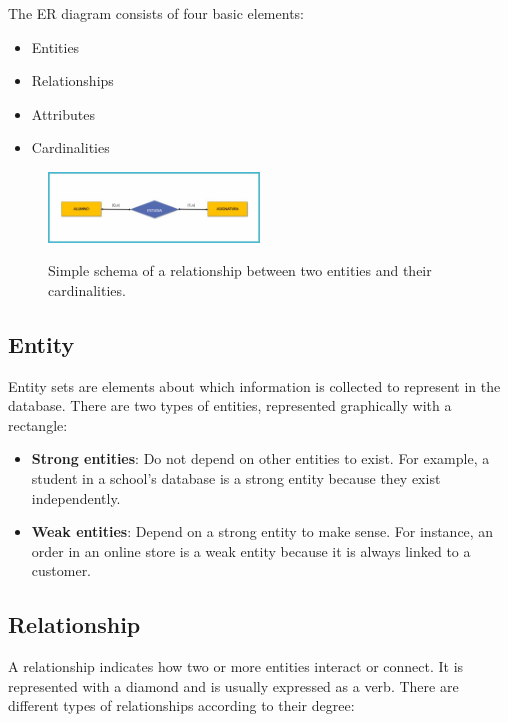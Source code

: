 \documentclass{article}
\begin{document}
The ER diagram consists of four basic elements:

\begin{itemize}
    \item Entities
    \item Relationships
    \item Attributes
    \item Cardinalities
\end{itemize}

\begin{figure}
	\centering
	\includegraphics[bb=0 0 900 300, width=0.5\textwidth]{figures/entidad-relacion-ejemplo.jpg}
	\label{fig:erexample1}
	\caption{Simple schema of a relationship between two entities and their cardinalities.}
\end{figure}

\subsection{Entity}

Entity sets are elements about which information is collected to represent in the database. There are two types of entities, represented graphically with a rectangle:

\begin{itemize}
    \item \textbf{Strong entities}: Do not depend on other entities to exist. For example, a student in a school's database is a strong entity because they exist independently.
    \item \textbf{Weak entities}: Depend on a strong entity to make sense. For instance, an order in an online store is a weak entity because it is always linked to a customer.
\end{itemize}

\subsection{Relationship}

A relationship indicates how two or more entities interact or connect. It is represented with a diamond and is usually expressed as a verb. There are different types of relationships according to their degree:
\end{document}
